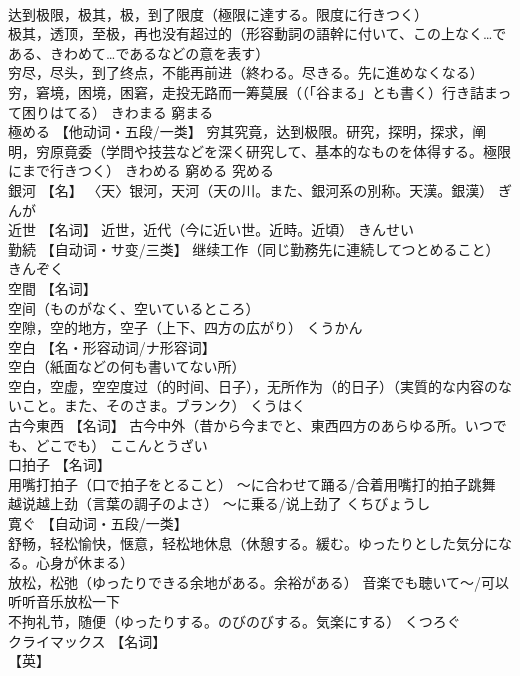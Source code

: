 \documentclass[8pt]{extreport}
\begin{document}
\begin{CJK}{UTF8}{min}
\\	达到极限，极其，极，到了限度（極限に達する。限度に行きつく） 
\\	极其，透顶，至极，再也没有超过的（形容動詞の語幹に付いて、この上なく…である、きわめて…であるなどの意を表す） 
\\	穷尽，尽头，到了终点，不能再前进（終わる。尽きる。先に進めなくなる） 
\\	穷，窘境，困境，困窘，走投无路而一筹莫展（（「谷まる」とも書く）行き詰まって困りはてる）	きわまる	窮まる
\\	極める	【他动词・五段/一类】 穷其究竟，达到极限。研究，探明，探求，阐明，穷原竟委（学問や技芸などを深く研究して、基本的なものを体得する。極限にまで行きつく）	きわめる	窮める 究める
\\	銀河	【名】 〈天〉银河，天河（天の川。また、銀河系の別称。天漢。銀漢）	ぎんが	
\\	近世	【名词】 近世，近代（今に近い世。近時。近頃）	きんせい	
\\	勤続	【自动词・サ变/三类】 继续工作（同じ勤務先に連続してつとめること）	きんぞく	
\\	空間	【名词】 
\\	空间（ものがなく、空いているところ） 
\\	空隙，空的地方，空子（上下、四方の広がり）	くうかん	
\\	空白	【名・形容动词/ナ形容词】 
\\	空白（紙面などの何も書いてない所） 
\\	空白，空虚，空空度过（的时间、日子），无所作为（的日子）（実質的な内容のないこと。また、そのさま。ブランク）	くうはく	
\\	古今東西	【名词】 古今中外（昔から今までと、東西四方のあらゆる所。いつでも、どこでも）	ここんとうざい	
\\	口拍子	【名词】 
\\	用嘴打拍子（口で拍子をとること） ～に合わせて踊る/合着用嘴打的拍子跳舞 
\\	越说越上劲（言葉の調子のよさ） ～に乗る/说上劲了	くちびょうし	
\\	寛ぐ	【自动词・五段/一类】 
\\	舒畅，轻松愉快，惬意，轻松地休息（休憩する。緩む。ゆったりとした気分になる。心身が休まる） 
\\	放松，松弛（ゆったりできる余地がある。余裕がある） 音楽でも聴いて～/可以听听音乐放松一下 
\\	不拘礼节，随便（ゆったりする。のびのびする。気楽にする）	くつろぐ	
\\	クライマックス	【名词】 
\\	【英】

\end{CJK}
\end{document}
